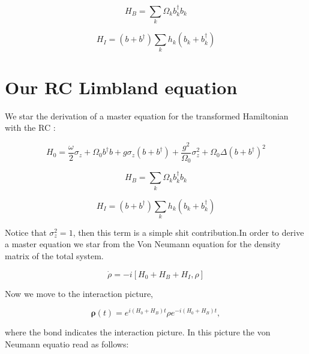 \documentclass[reprint,aps,onecolumn,pra,notitlepage,nofootinbib]{revtex4-1}
\theoremstyle{definition}
\numberwithin{equation}{section}
\begin{document}
\begin{equation}
    H_B= \sum_{k} \Omega_k b_k ^{\dagger} b_k
\end{equation}    

\begin{equation}
    H_I= \left( b + b ^{\dagger} \right) \sum_k h_k \left( b_k + b_k ^{\dagger} \right)
\end{equation}



\section*{Our RC Limbland equation}


We star the derivation of a master equation for the transformed Hamiltonian with the RC  :

\begin{equation}
    H_0= \frac{\omega}{2} \sigma_z +  \Omega_0 b ^{\dagger} b +g \sigma_z  \left( b + b ^{\dagger} \right) + \frac{g^2}{\Omega_0} \sigma_z^2 + \Omega_0 \Delta \left( b + b ^{\dagger} \right)^2
\end{equation}

\begin{equation}
    H_B= \sum_{k} \Omega_k b_k ^{\dagger} b_k
\end{equation}    

\begin{equation}
    H_I= \left( b + b ^{\dagger} \right) \sum_k h_k \left( b_k + b_k ^{\dagger} \right)
\end{equation}

Notice that $\sigma_z^2= 1$, then this term is a simple shit contribution.In order to derive a master equation we star from the Von Neumann equation for the density matrix of the total system.

\begin{equation}
    \dot{\rho} = -i \left[ H_0 + H_B + H_I , \rho \right]
\end{equation}

Now we move to the interaction picture, 

\begin{equation}
  \boldsymbol{\rho}(t) = e^{i (H_0+H_B) t} \rho e^{-i (H_0+H_B) t},
\end{equation}

where the bond indicates the interaction picture. In this picture the von Neumann equatio read as follows:
\end{document}
